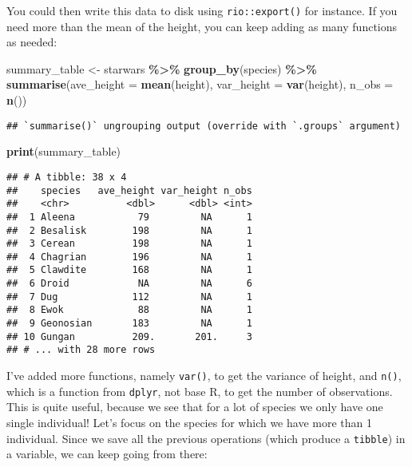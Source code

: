 \documentclass[
]{article}
\newenvironment{Shaded}{\begin{snugshade}}{\end{snugshade}}
\newcommand{\DataTypeTok}[1]{\textcolor[rgb]{0.13,0.29,0.53}{#1}}
\newcommand{\KeywordTok}[1]{\textcolor[rgb]{0.13,0.29,0.53}{\textbf{#1}}}
\newcommand{\NormalTok}[1]{#1}
\newcommand{\OperatorTok}[1]{\textcolor[rgb]{0.81,0.36,0.00}{\textbf{#1}}}
\newcommand{\StringTok}[1]{\textcolor[rgb]{0.31,0.60,0.02}{#1}}
\begin{document}
You could then write this data to disk using \texttt{rio::export()} for instance. If you need more than the
mean of the height, you can keep adding as many functions as needed:

\begin{Shaded}
\begin{Highlighting}[]
\NormalTok{summary\_table \textless{}{-}}\StringTok{ }\NormalTok{starwars }\OperatorTok{\%\textgreater{}\%}
\StringTok{  }\KeywordTok{group\_by}\NormalTok{(species) }\OperatorTok{\%\textgreater{}\%}
\StringTok{  }\KeywordTok{summarise}\NormalTok{(}\DataTypeTok{ave\_height =} \KeywordTok{mean}\NormalTok{(height), }\DataTypeTok{var\_height =} \KeywordTok{var}\NormalTok{(height), }\DataTypeTok{n\_obs =} \KeywordTok{n}\NormalTok{())}
\end{Highlighting}
\end{Shaded}

\begin{verbatim}
## `summarise()` ungrouping output (override with `.groups` argument)
\end{verbatim}

\begin{Shaded}
\begin{Highlighting}[]
\KeywordTok{print}\NormalTok{(summary\_table)}
\end{Highlighting}
\end{Shaded}

\begin{verbatim}
## # A tibble: 38 x 4
##    species   ave_height var_height n_obs
##    <chr>          <dbl>      <dbl> <int>
##  1 Aleena           79         NA      1
##  2 Besalisk        198         NA      1
##  3 Cerean          198         NA      1
##  4 Chagrian        196         NA      1
##  5 Clawdite        168         NA      1
##  6 Droid            NA         NA      6
##  7 Dug             112         NA      1
##  8 Ewok             88         NA      1
##  9 Geonosian       183         NA      1
## 10 Gungan          209.       201.     3
## # ... with 28 more rows
\end{verbatim}

I've added more functions, namely \texttt{var()}, to get the variance of height, and \texttt{n()}, which
is a function from \texttt{dplyr}, not base R, to get the number of observations. This is quite useful,
because we see that for a lot of species we only have one single individual! Let's focus on the
species for which we have more than 1 individual. Since we save all the previous operations (which
produce a \texttt{tibble}) in a variable, we can keep going from there:
\end{document}
